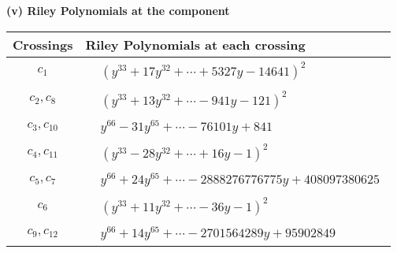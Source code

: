 \documentclass[1p]{elsarticle_modified}
\theoremstyle{definition}
\begin{document}
\newpage\renewcommand{\arraystretch}{1}
\flushleft \textbf{(v) Riley Polynomials at the component}\newline \\
\begin{tabular}{m{50pt}|m{274pt}}
Crossings & \hspace{64pt}Riley Polynomials at each crossing \\
\hline $$\begin{aligned}c_{1}\end{aligned}$$&$\begin{aligned}
&(y^{33}+17 y^{32}+\cdots+5327 y-14641)^{2}
\end{aligned}$\\
\hline $$\begin{aligned}c_{2},c_{8}\end{aligned}$$&$\begin{aligned}
&(y^{33}+13 y^{32}+\cdots-941 y-121)^{2}
\end{aligned}$\\
\hline $$\begin{aligned}c_{3},c_{10}\end{aligned}$$&$\begin{aligned}
&y^{66}-31 y^{65}+\cdots-76101 y+841
\end{aligned}$\\
\hline $$\begin{aligned}c_{4},c_{11}\end{aligned}$$&$\begin{aligned}
&(y^{33}-28 y^{32}+\cdots+16 y-1)^{2}
\end{aligned}$\\
\hline $$\begin{aligned}c_{5},c_{7}\end{aligned}$$&$\begin{aligned}
&y^{66}+24 y^{65}+\cdots-2888276776775 y+408097380625
\end{aligned}$\\
\hline $$\begin{aligned}c_{6}\end{aligned}$$&$\begin{aligned}
&(y^{33}+11 y^{32}+\cdots-36 y-1)^{2}
\end{aligned}$\\
\hline $$\begin{aligned}c_{9},c_{12}\end{aligned}$$&$\begin{aligned}
&y^{66}+14 y^{65}+\cdots-2701564289 y+95902849
\end{aligned}$\\
\hline
\end{tabular}\\~\\
\end{document}
